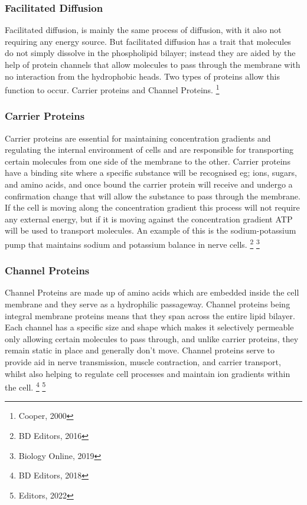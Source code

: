 \documentclass[a4paper,12pt,twoside,english]{all-in-one} %
\begin{document}
\subsubsection{Facilitated Diffusion}
Facilitated diffusion, is mainly the same process of diffusion, with it also not requiring any energy source. But facilitated diffusion has a trait that molecules do not simply dissolve in the phospholipid bilayer; instead they are aided by the help of protein channels that allow molecules to pass through the membrane with no interaction from the hydrophobic heads. Two types of proteins allow this function to occur. Carrier proteins and Channel Proteins. \footnote{Cooper, 2000}

\subsubsection{Carrier Proteins}
Carrier proteins are essential for maintaining concentration gradients and regulating the internal environment of cells and are responsible for transporting certain molecules from one side of the membrane to the other. Carrier proteins have a binding site where a specific substance will be recognised eg; ions, sugars, and amino acids, and once bound the carrier protein will receive and undergo a confirmation change that will allow the substance to pass through the membrane. If the cell is moving along the concentration gradient this process will not require any external energy, but if it is moving against the concentration gradient ATP will be used to transport molecules. An example of this is the sodium-potassium pump that maintains sodium and potassium balance in nerve cells. \footnote{BD Editors, 2016} \footnote{Biology Online, 2019}

\subsubsection{Channel Proteins}
Channel Proteins are made up of amino acids which are embedded inside the cell membrane and they serve as a hydrophilic passageway. Channel proteins being integral membrane proteins means that they span across the entire lipid bilayer. Each channel has a specific size and shape which makes it selectively permeable only allowing certain molecules to pass through, and unlike carrier proteins, they remain static in place and generally don't move. Channel proteins serve to provide aid in nerve transmission, muscle contraction, and carrier transport, whilst also helping to regulate cell processes and maintain ion gradients within the cell. \footnote{BD Editors, 2018} \footnote{Editors, 2022}
\end{document}
